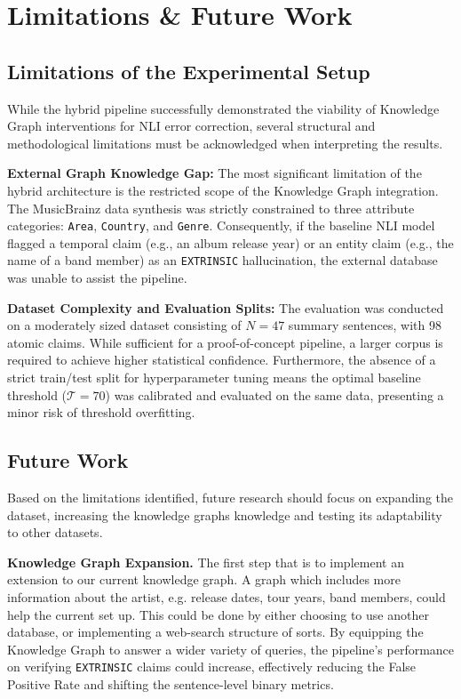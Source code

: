 \section{Limitations \& Future Work}

\subsection{Limitations of the Experimental Setup}
While the hybrid pipeline successfully demonstrated the viability of Knowledge Graph interventions for NLI error correction, several structural and methodological limitations must be acknowledged when interpreting the results.

\textbf{External Graph Knowledge Gap:} The most significant limitation of the hybrid architecture is the restricted scope of the Knowledge Graph integration. The MusicBrainz data synthesis was strictly constrained to three attribute categories: \texttt{Area}, \texttt{Country}, and \texttt{Genre}. Consequently, if the baseline NLI model flagged a temporal claim (e.g., an album release year) or an entity claim (e.g., the name of a band member) as an \texttt{EXTRINSIC} hallucination, the external database was unable to assist the pipeline.

\textbf{Dataset Complexity and Evaluation Splits:} The evaluation was conducted on a moderately sized dataset consisting of $N=47$ summary sentences, with 98 atomic claims. While sufficient for a proof-of-concept pipeline, a larger corpus is required to achieve higher statistical confidence. Furthermore, the absence of a strict train/test split for hyperparameter tuning means the optimal baseline threshold ($\mathcal{T} = 70$) was calibrated and evaluated on the same data, presenting a minor risk of threshold overfitting. 

\subsection{Future Work}
Based on the limitations identified, future research should focus on expanding the dataset, increasing the knowledge graphs knowledge and testing its adaptability to other datasets. 

\textbf{Knowledge Graph Expansion.} The first step that is to implement an extension to our current knowledge graph. A graph which includes more information about the artist, e.g. release dates, tour years, band members, could help the current set up. This could be done by either choosing to use another database, or implementing a web-search structure of sorts. By equipping the Knowledge Graph to answer a wider variety of queries, the pipeline's performance on verifying \texttt{EXTRINSIC} claims could increase, effectively reducing the False Positive Rate and shifting the sentence-level binary metrics.

